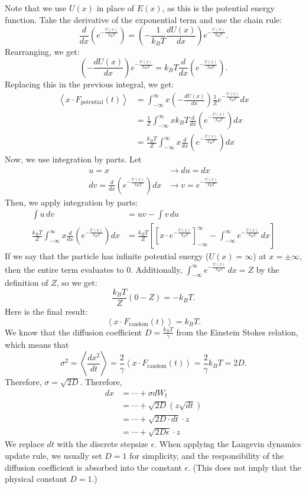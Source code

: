\documentclass{article}
\begin{document}
Note that we use $U(x)$ in place of $E(x)$, as this is the potential energy function. Take the derivative of the exponential term and use the chain rule:
\[\frac{d}{dx}\left(e^{-\frac{U(x)}{k_B T}}\right) = \left(-\frac{1}{k_B T}\frac{dU(x)}{dx}\right) e^{-\frac{U(x)}{k_B T}}.\]
Rearranging, we get:
\[\left(-\frac{dU(x)}{dx}\right) e^{-\frac{U(x)}{k_B T}} = k_B T \frac{d}{dx}\left(e^{-\frac{U(x)}{k_B T}}\right).\]
Replacing this in the previous integral, we get:
\begin{align*}
    \left<x\cdot F_{\text{potential}}(t)\right> &= \int_{-\infty}^{\infty} x \left(-\frac{dU(x)}{dx}\right)  \frac{1}{Z} e^{-\frac{U(x)}{k_B T}} dx\\
    &= \frac{1}{Z} \int_{-\infty}^{\infty} x k_B T \frac{d}{dx}\left(e^{-\frac{U(x)}{k_B T}}\right) dx\\
    &= \frac{k_B T}{Z} \int_{-\infty}^{\infty} x \frac{d}{dx}\left(e^{-\frac{U(x)}{k_B T}}\right) dx
\end{align*}
Now, we use integration by parts. Let 
\begin{align*}
    u = x &\to du = dx\\
    dv = \frac{d}{dx}\left(e^{-\frac{U(x)}{k_B T}}\right) dx &\to v = e^{-\frac{U(x)}{k_B T}}
\end{align*}
Then, we apply integration by parts:
\begin{align*}
    \int u \, dv &= uv - \int v \, du\\
    \frac{k_B T}{Z} \int_{-\infty}^{\infty} x \frac{d}{dx}\left(e^{-\frac{U(x)}{k_B T}}\right) dx &= \frac{k_B T}{Z} \left[\left[x\cdot e^{-\frac{U(x)}{k_B T}}\right]_{-\infty}^{\infty} - \int_{-\infty}^{\infty} e^{-\frac{U(x)}{k_B T}} \, dx\right]
\end{align*}
If we say that the particle has infinite potential energy ($U(x)=\infty$) at $x=\pm \infty$, then the entire term evaluates to 0. Additionally, $\int_{-\infty}^{\infty} e^{-\frac{U(x)}{k_B T}} \, dx = Z$ by the definition of $Z$, so we get:
\[\frac{k_B T}{Z} (0-Z) = -k_B T.\]
Here is the final result:
\[\left<x\cdot F_{\text{random}}(t)\right> = k_B T.\]
We know that the diffusion coefficient $D = \frac{k_B T}{\gamma}$ from the Einstein Stokes relation, which means that 
\[\sigma^2 = \left<\frac{dx^2}{dt}\right> = \frac{2}{\gamma} \left<x\cdot F_{\text{random}}(t)\right> = \frac{2}{\gamma} k_B T = 2D.\]
Therefore, $\sigma = \sqrt{2D}$. Therefore,
\begin{align*}
    dx &= \cdots + \sigma dW_t\\
    &= \cdots + \sqrt{2D} \left(z \sqrt{dt}\right) \\
    &= \cdots + \sqrt{2D\cdot dt} \cdot z \\
    &= \cdots + \sqrt{2D\epsilon} \cdot z
\end{align*}
We replace $dt$ with the discrete stepsize $\epsilon$. When applying the Langevin dynamics update rule, we usually set $D=1$ for simplicity, and the responsibility of the diffusion coefficient is absorbed into the constant $\epsilon$. (This does not imply that the physical constant $D=1$.)
\end{document}
